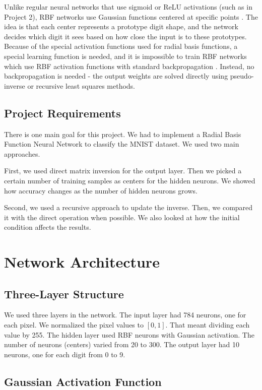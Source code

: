 \documentclass[12pt]{article}
\begin{document}
	
Unlike regular neural networks that use sigmoid or ReLU activations (such as in Project 2), RBF networks use Gaussian functions centered at specific points \cite{saralajew2024}. The idea is that each center represents a prototype digit shape, and the network decides which digit it sees based on how close the input is to these prototypes. Because of the special activation functions used for radial basis functions, a special learning function is needed, and it is impossible to train RBF networks which use RBF activation functions with standard backpropagation \cite{rbflearning}. Instead, no backpropagation is needed - the output weights are solved directly using pseudo-inverse or recursive least squares methods.
	
	
\subsection{Project Requirements}

There is one main goal for this project. We had to implement a Radial Basis Function Neural Network to classify the MNIST dataset. We used two main approaches.

First, we used direct matrix inversion for the output layer. Then we picked a certain number of training samples as centers for the hidden neurons. We showed how accuracy changes as the number of hidden neurons grows.

Second, we used a recursive approach to update the inverse. Then, we compared it with the direct operation when possible. We also looked at how the initial condition affects the results.
	

	\section{Network Architecture}
	
\subsection{Three-Layer Structure}

We used three layers in the network. The input layer had 784 neurons, one for each pixel. We normalized the pixel values to $[0,1]$. That meant dividing each value by 255. The hidden layer used RBF neurons with Gaussian activation. The number of neurons (centers) varied from 20 to 300. The output layer had 10 neurons, one for each digit from 0 to 9.

	
	\subsection{Gaussian Activation Function}
	
\end{document}
